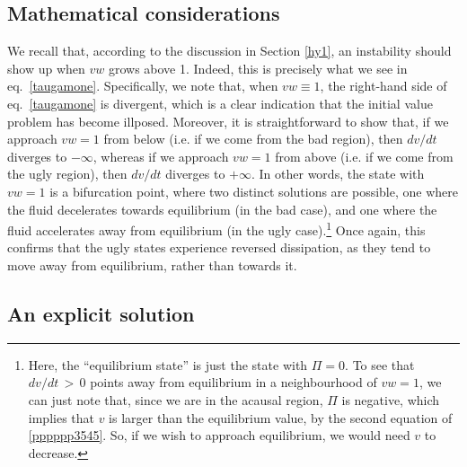 \documentclass[aps, prd, showkeys,superscriptaddress, nofootinbib,floatfix]{revtex4-2}
\begin{document}
\subsection{Mathematical considerations}

We recall that, according to the discussion in Section \ref{hy1}, an instability should show up when $vw$ grows above 1. Indeed, this is precisely what we see in eq.~\eqref{taugamone}. Specifically, we note that, when $vw \equiv 1$, the right-hand side of eq.~\eqref{taugamone} is divergent, which is a clear indication that the initial value problem has become illposed. Moreover, it is straightforward to show that, if we approach $vw=1$ from below (i.e. if we come from the bad region), then $dv/dt$ diverges to $-\infty$, whereas if we approach $vw=1$ from above (i.e. if we come from the ugly region), then $dv/dt$ diverges to $+\infty$. In other words, the state with $vw=1$ is a bifurcation point, where two distinct solutions are possible, one where the fluid decelerates towards equilibrium (in the bad case), and one where the fluid accelerates away from equilibrium (in the ugly case).\footnote{Here, the ``equilibrium state'' is just the state with $\Pi=0$. To see that $dv/dt\,{>}\,0$ points away from equilibrium in a neighbourhood of $vw=1$, we can just note that, since we are in the acausal region, $\Pi$ is negative, which implies that $v$ is larger than the equilibrium value, by the second equation of \eqref{pppppp3545}. So, if we wish to approach equilibrium, we would need $v$ to decrease.} Once again, this confirms that the ugly states experience reversed dissipation, as they tend to move away from equilibrium, rather than towards it.







\subsection{An explicit solution}
\end{document}
